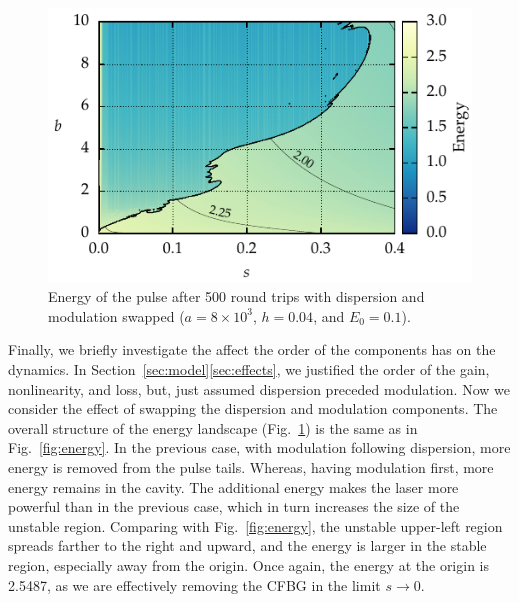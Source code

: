 \documentclass[9pt,twocolumn,twoside]{osajnl}
\begin{document}
\begin{figure}[tbp]
	\centering
	\includegraphics{Figures/ParamSpaceEnergySwitch}
	\caption{Energy of the pulse after 500 round trips with dispersion and modulation swapped ($a = 8 \times 10^3$, $h = 0.04$, and $E_0 = 0.1$).}
	\label{fig:energyswitch}
\end{figure}

Finally, we briefly investigate the affect the order of the components has on the dynamics. In Section~\ref{sec:model}\ref{sec:effects}, we justified the order of the gain, nonlinearity, and loss, but, just assumed dispersion preceded modulation. Now we consider the effect of swapping the dispersion and modulation components. The overall structure of the energy landscape (Fig.~\ref{fig:energyswitch}) is the same as in Fig.~\ref{fig:energy}. In the previous case, with modulation following dispersion, more energy is removed from the pulse tails. Whereas, having modulation first, more energy remains in the cavity. The additional energy makes the laser more powerful than in the previous case, which in turn increases the size of the unstable region. Comparing with Fig.~\ref{fig:energy}, the unstable upper-left region spreads farther to the right and upward, and the energy is larger in the stable region, especially away from the origin. Once again, the energy at the origin is 2.5487, as we are effectively removing the CFBG in the limit $s \rightarrow 0$.
\end{document}
